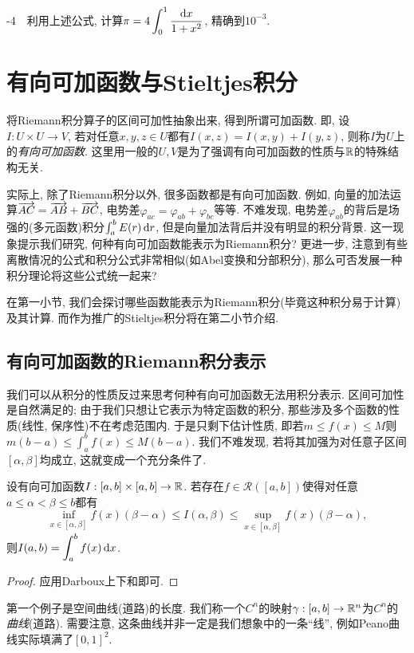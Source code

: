 -4~~利用上述公式, 计算$\displaystyle \pi = 4\int_0^1 \frac{\mathop{}\!\mathrm{d} x}{1+x^2}$, 精确到$10^{-3}$. 


\newpage
\section{有向可加函数与Stieltjes积分}

将Riemann积分算子的区间可加性抽象出来, 得到所谓可加函数. 即, 设$I:U \times U \to V$, 若对任意$x,y,z \in U$都有$I(x,z)=I(x,y)+I(y,z)$, 则称$I$为$U$上的\textit{有向可加函数}. 这里用一般的$U,V$是为了强调有向可加函数的性质与$\mathbb{R}$的特殊结构无关. 

实际上, 除了Riemann积分以外, 很多函数都是有向可加函数. 例如, 向量的加法运算$\overrightarrow{AC}=\overrightarrow{AB}+\overrightarrow{BC}$, 电势差$\varphi _{ac}=\varphi _{ab}+\varphi _{bc}$等等. 不难发现, 电势差$\varphi _{ab}$的背后是场强的(多元函数)积分$\int_a^b E(r) \mathop{}\!\mathrm{d} r$, 但是向量加法背后并没有明显的积分背景. 这一现象提示我们研究, 何种有向可加函数能表示为Riemann积分? 更进一步, 注意到有些离散情况的公式和积分公式非常相似(如Abel变换和分部积分), 那么可否发展一种积分理论将这些公式统一起来? 

在第一小节, 我们会探讨哪些函数能表示为Riemann积分(毕竟这种积分易于计算)及其计算. 而作为推广的Stieltjes积分将在第二小节介绍. 

\subsection{有向可加函数的Riemann积分表示}

我们可以从积分的性质反过来思考何种有向可加函数无法用积分表示. 区间可加性是自然满足的; 由于我们只想让它表示为特定函数的积分, 那些涉及多个函数的性质(线性, 保序性)不在考虑范围内. 于是只剩下估计性质, 即若$m \leq f(x) \leq M$则$m(b-a) \leq \int_a^b f(x) \leq M(b-a)$. 我们不难发现, 若将其加强为对任意子区间$[\alpha ,\beta]$均成立, 这就变成一个充分条件了. 

\begin{proposition}{}
	设有向可加函数$I:[a,b] \times [a,b] \to \mathbb{R}$. 若存在$f \in \mathcal{R}([a,b])$使得对任意$a \leq \alpha < \beta \leq b$都有$$\inf_{x\in [\alpha ,\beta]} f(x) (\beta -\alpha) \leq I(\alpha ,\beta) \leq \sup_{x\in [\alpha ,\beta]} f(x) (\beta -\alpha),$$
	则$\displaystyle I(a,b)=\int_a^b f(x) \mathop{}\!\mathrm{d} x$. 
\end{proposition}
\begin{proof}
	应用Darboux上下和即可. 
\end{proof}

第一个例子是空间曲线(道路)的长度. 我们称一个$C^{n}$的映射$\gamma :[a,b] \to \mathbb{R} ^n$为$C^{n}$的\textit{曲线}(道路). 需要注意, 这条曲线并非一定是我们想象中的一条“线”, 例如Peano曲线实际填满了$[0,1]^2$. 

